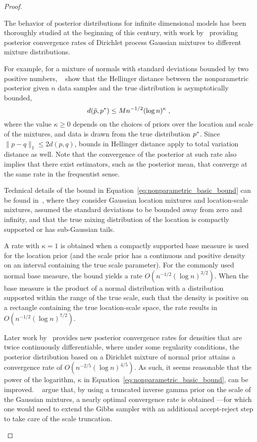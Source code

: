 \begin{proof}
\begin{itemize}
	The behavior of posterior distributions for infinite dimensional models has been thoroughly studied at the beginning of this century, with work by~\citet{j-Ghosal2001,j-Ghosal2007} providing posterior convergence rates of Dirichlet process Gaussian mixtures to different mixture distributions.
	
	For example, for a mixture of normals with standard deviations bounded by two positive numbers, ~\citet{j-Ghosal2001} show that the Hellinger distance between the nonparametric posterior given $n$ data samples and the true distribution is asymptotically bounded,
	\begin{equation}
	d(\tilde{p},p^*) \leq M n^{-1/2}(\log n)^\kappa \; ,
	\label{eq:nonparametric_basic_bound}
	\end{equation}
	where the value $\kappa \geq 0$ depends on the choices of priors over the location and scale of the mixtures, and data is drawn from the true distribution $p^*$. Since $\|p-q\|_1 \leq 2 d(p,q)$, bounds in Hellinger distance apply to total variation distance as well. Note that the convergence of the posterior at such rate also implies that there exist estimators, such as the posterior mean, that converge at the same rate in the frequentist sense.
	
	Technical details of the bound in Equation~\eqref{eq:nonparametric_basic_bound} can be found in~\citep{j-Ghosal2001}, where they consider Gaussian location mixtures and location-scale mixtures, assumed the standard deviations to be bounded away from zero and infinity, and that the true mixing distribution of the location is compactly supported or has sub-Gaussian tails.
	
	A rate with $\kappa=1$ is obtained when a compactly supported base measure is used for the location prior (and the scale prior has a continuous and positive density on an interval containing the true scale parameter).
	For the commonly used normal base measure, the bound yields a rate $O(n^{-1/2}(\log n)^{3/2})$.
	When the base measure is the product of a normal distribution with a distribution supported within the range of the true scale, such that the density is positive on a rectangle containing the true location-scale space, the rate results in $O(n^{-1/2}(\log n)^{7/2})$.
	
	Later work by~\citet{j-Ghosal2007} provides new posterior convergence rates for densities that are twice continuously differentiable, where under some regularity conditions, the posterior distribution based on a Dirichlet mixture of normal prior attains a convergence rate of $O(n^{-2/5}(\log n)^{4/5})$.
	As such, it seems reasonable that the power of the logarithm, \ie $\kappa$ in Equation~\eqref{eq:nonparametric_basic_bound}, can be improved.
	~\citet{j-Ghosal2007} argue that, by using a truncated inverse gamma prior on the scale of the Gaussian mixtures, a nearly optimal convergence rate is obtained ---for which one would need to extend the Gibbs sampler with an additional accept-reject step to take care of the scale truncation.
	

\end{itemize}
\end{proof}
